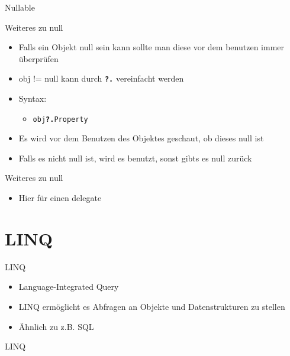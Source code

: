 \begin{frame}{Nullable}
		
\end{frame}

\begin{frame}{Weiteres zu null}
	\begin{itemize}
		\item Falls ein Objekt \alert{null} sein kann sollte man diese vor dem benutzen immer überprüfen
	\end{itemize}
	\begin{itemize}	
		\item \alert{obj != null} kann durch \texttt{\textbf{\alert{?.}}} vereinfacht werden	
		\item Syntax:
		\begin{itemize}
			\item \texttt{obj\textbf{\alert{?.}}Property}
		\end{itemize}
		\item Es wird vor dem Benutzen des Objektes geschaut, ob dieses \alert{null} ist
		\item Falls es nicht \alert{null} ist, wird es benutzt, sonst gibts es \alert{null} zurück
	\end{itemize}
\end{frame}

\begin{frame}{Weiteres zu null}
	
	\begin{itemize}
		\item Hier für einen \alert{delegate}
	\end{itemize}		
		
\end{frame}

\section{LINQ}
\begin{frame}{LINQ}
	\begin{itemize}
		\item Language-Integrated Query
		\item LINQ ermöglicht es Abfragen an Objekte und Datenstrukturen zu stellen
		\item Ähnlich zu z.B. SQL
	\end{itemize}
\end{frame}

\begin{frame}{LINQ}
		
\end{frame}


